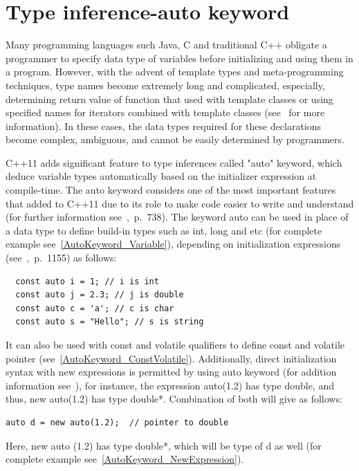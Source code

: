 \documentclass[11pt]{report}
\begin{document}
\section{Type inference-auto keyword}
\label{section: Auto keyword}
Many programming languages such Java, C and traditional C++ obligate a programmer to specify data type of variables before initializing and using them in a program. However, with the advent of template types and meta-programming techniques, type names become extremely long and complicated, especially, determining return value of function that used with template classes or using specified names for iterators combined with template classes (see~\cite{Stroustrup:2012:Cpp11} for more information). In these cases, the data types required for these declarations become complex, ambiguous, and cannot be easily determined by programmers.

C++11 adds significant feature to type inferences called "auto" keyword, which deduce variable types automatically based on the initializer expression at compile-time. The auto keyword considers one of the most important features that added to C++11 due to its role to make code easier to write and understand (for further information see~\cite{Gregorie:professionalcpp},~p.~738). The keyword auto can be used in place of a data type to define build-in types such as int, long and etc (for complete example see~\ref{AutoKeyword_Variable}), depending on initialization expressions (see~\cite{Prata:2012:Cpp},~p.~1155) as follows: 
\begin{lstlisting}
  const auto i = 1; // i is int
  const auto j = 2.3; // j is double
  const auto c = 'a'; // c is char
  const auto s = "Hello"; // s is string
\end{lstlisting}
It can also be used with const and volatile qualifiers to define const and volatile pointer (see~\ref{AutoKeyword_ConstVolatile}). Additionally, direct initialization syntax with new expressions is permitted by using auto keyword (for addition information see~\cite{Stroustrup:2012:Cpp11}), for instance, the expression auto(1.2) has type double, and thus, new auto(1.2) has type double*. Combination of both will give as follows:
\begin{lstlisting}
auto d = new auto(1.2);  // pointer to double
\end{lstlisting}

Here, new auto (1.2) has type double*, which will be type of d as well (for complete example see~\ref{AutoKeyword_NewExpression}).
\end{document}
